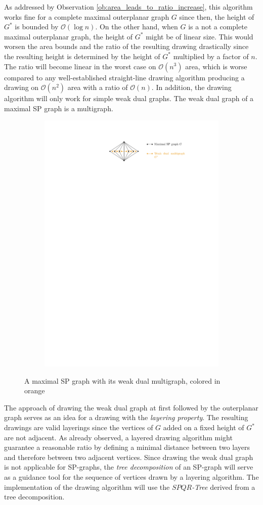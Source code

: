 As addressed by Observation \ref{ob:area_leads_to_ratio_increase}, this algorithm works fine for a complete maximal outerplanar graph $G$ since then, the height of $G^*$ is bounded by $\mathcal{O}(\log n)$. On the other hand, when $G$ is a not a complete maximal outerplanar graph, the height of $G^*$ might be of linear size. This would worsen the area bounds and the ratio of the resulting drawing drastically since the resulting height is determined by the height of $G^*$ multiplied by a factor of $n$. The ratio will become linear in the worst case on $\mathcal{O}(n^3)$ area, which is worse compared to any well-established straight-line drawing algorithm producing a drawing on $\mathcal{O}(n^2)$ area with a ratio of $\mathcal{O}(n)$. In addition, the drawing algorithm will only work for simple weak dual graphs. The weak dual graph of a maximal SP graph is a multigraph.
	\begin{figure}[H]
	\centering
	\begin{subfigure}{\textwidth}
		\centering
		\includegraphics[page=1,width=0.6\linewidth]{graphics/maximal_sp_weak_dual.pdf}
	\end{subfigure}
	\caption{A maximal SP graph with its weak dual multigraph, colored in orange}
\end{figure}
The approach of drawing the weak dual graph at first followed by the outerplanar graph serves as an idea for a drawing with the \emph{layering property}. The resulting drawings are valid layerings since the vertices of $G$ added on a fixed height of $G^*$ are not adjacent. As already observed, a layered drawing algorithm might guarantee a reasonable ratio by defining a minimal distance between two layers and therefore between two adjacent vertices. Since drawing the weak dual graph is not applicable for SP-graphs, the \emph{tree decomposition} of an SP-graph will serve as a guidance tool for the sequence of vertices drawn by a layering algorithm. The implementation of the drawing algorithm will use the \emph{$SPQR$-Tree} derived from a tree decomposition.

